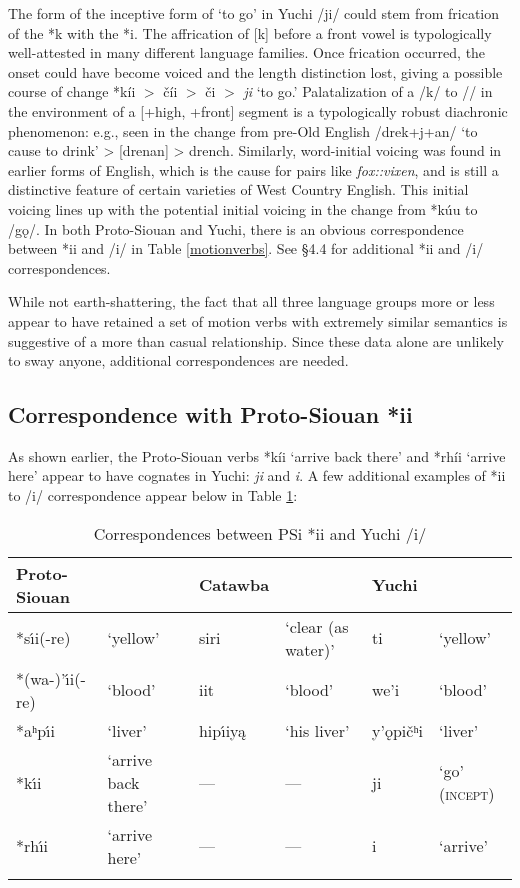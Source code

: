 \documentclass[output=paper]{LSP/langsci}
\begin{document}
The form of the inceptive form of `to go' in Yuchi /ji/ could stem from frication of the *k with the *i. The affrication of [k] before a front vowel is typologically well-attested in many different language families. Once frication occurred, the onset could have become voiced and the length distinction lost, giving a possible course of change *k\'ii $>$ {\v{c}}\'ii $>$ {\v{c}}i $>$ \emph{ji} `to go.' Palatalization of a /k/ to // in the environment of a [+high, +front] segment is a typologically robust diachronic phenomenon: e.g., seen in the change from pre-Old English /drek+j+an/ `to cause to drink' > [drenan] > drench. Similarly, word-initial voicing was found in earlier forms of English, which is the cause for pairs like \textit{fox::vixen}, and is still a distinctive feature of certain varieties of West Country English. This initial voicing lines up with the potential initial voicing in the change from *k\'uu to /g\k{o}/. In both Proto-Siouan and Yuchi, there is an obvious correspondence between *ii and /i/ in Table \ref{motionverbs}. See \S4.4 for additional *ii and /i/ correspondences.

While not earth-shattering, the fact that all three language groups more or less appear to have retained a set of motion verbs with extremely similar semantics is suggestive of a more than casual relationship. Since these data alone are unlikely to sway anyone, additional correspondences are needed.

\subsection{Correspondence with Proto-Siouan *ii}

As shown earlier, the Proto-Siouan verbs *k\'ii `arrive back there' and *rh\'ii `arrive here' appear to have cognates in Yuchi: \emph{ji} and \emph{\textbeltl i}. A few additional examples of *ii to /i/ correspondence appear below in Table \ref{*ii}:

\begin{table}[h]
\footnotesize
\centering
\caption{Correspondences between PSi *ii and Yuchi /i/}\label{*ii}
	\begin{tabular}{llllll}\lsptoprule
	Proto-Siouan 			&	~	&	Catawba	&	~			&	Yuchi		&	~	\\
\midrule
	*s\'\i i(-re)				&	`yellow'	&	siri		&	`clear (as water)'	&	ti			&	`yellow'\\
	*(wa-)'\'\i i(-re)	&	`blood'		&	iit		&	`blood'					&	we'i		&	`blood'\\ 
	*aʰp\'\i i				&	`liver'		&	hip\'\i iy\k{a}		&	`his liver'					&	y'\k{o}pi\v{c}{ʰ}i		&	`liver'\\ 
	*k\'\i i & `arrive back there' & --- & --- & ji & `go' (\textsc{incept})\\
	*rh\'\i i & `arrive here' & --- & --- & \textbeltl i    & `arrive'  \\
\lspbottomrule	\end{tabular}
\end{table}
\end{document}
